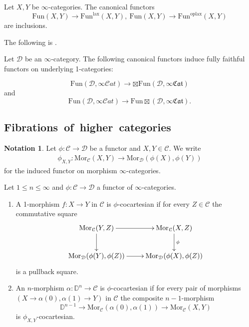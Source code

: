 \documentclass[10pt,oneside]{article}
\numberwithin{equation}{section} %
\numberwithin{figure}{section} %
\theoremstyle{plain}
\theoremstyle{definition}
\newtheorem{notation}[thm]{Notation}
\newcommand{\bD}{{\mathbb D}}
\newcommand{\mC}{{\mathcal C}}
\newcommand{\mD}{{\mathcal D}}
\newcommand{\n}{{n}}
\newcommand{\Fun}{\mathrm{Fun}}
\newcommand{\lax}{{\mathrm{lax}}}
\newcommand{\oplax}{{\mathrm{oplax}}}
\newcommand{\Mor}{{\mathrm{Mor}}}
\newcommand{\scat}{\mathcal{C}\mathit{at}}
\newcommand{\fcat}{\mathfrak{Cat}}
\begin{document}
\begin{theorem}\label{funcompo}

Let $X,Y$ be $\infty$-categories. The canonical functors
$$ \Fun(X, Y) \to \Fun^\lax(X, Y), \ \Fun(X, Y) \to \Fun^\oplax(X, Y)$$
are inclusions.
    
\end{theorem}

The following is \cite[Theorem 4.2.8.]{oriented}.

\begin{theorem}\label{presheaves}
Let $\mD$ be an $\infty$-category.
The following canonical functors induce fully faithful functors on underlying 1-categories:

$$\Fun(\mD,\infty\scat) \to {\boxtimes\Fun}(\mD,\infty\fcat) $$
and 
$$\Fun(\mD,\infty\scat) \to {\Fun\boxtimes}(\mD,\infty\fcat). $$
\end{theorem}


\subsection{\mbox{Fibrations of higher categories}}



\begin{notation}Let $\phi: \mC \to \mD$ be a functor and $X,Y \in \mC.$ 
We write
\begin{align*}
\phi_{X,Y}:\Mor_\mC(X,Y)\to\Mor_\mD(\phi(X),\phi(Y))
\end{align*}
for the induced functor on morphism $\infty$-categories.
\end{notation}

\begin{definition}Let $1 \leq \n \leq \infty$ and $\phi: \mC \to \mD$ a functor of $\infty$-categories.

\begin{enumerate}[\normalfont(1)]\setlength{\itemsep}{-2pt}

\item A 1-morphism $f: X \to Y$ in $\mC$ is $\phi$-cocartesian if for every $Z\in \mC$ the commutative square 
\begin{equation}\label{filler}
\begin{xy}
\xymatrix{
\Mor_\mC(Y,Z) \ar[d] \ar[r]
& \Mor_\mC(X,Z) \ar[d]^\phi
\\ 
\Mor_\mD(\phi(Y), \phi(Z)) \ar[r] & \Mor_\mD(\phi(X), \phi(Z))
}
\end{xy}\end{equation}
is a pullback square.



\item An $n$-morphism $\alpha:\bD^n\to\mC$ is $\phi$-cocartesian if
for every pair of morphisms $(X \to \alpha(0), \alpha(1) \to Y)$ in $\mC$ the composite $n-1$-morphism
\[
\bD^{n-1}\to\Mor_\mC(\alpha(0),\alpha(1)) \to \Mor_\mC(X,Y)
\]
is $\phi_{X,Y}$-cocartesian.
\end{enumerate}
\end{definition}
\end{document}
